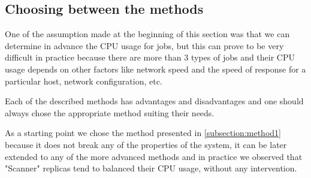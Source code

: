 \subsection{Choosing between the methods}
One of the assumption made at the beginning of this section was that we can determine in advance the CPU usage for jobs, but this can prove to be very difficult in practice because there are more than 3 types of jobs and their CPU usage depends on other factors like network speed and the speed of response for a particular host, network configuration, etc.

Each of the described methods has advantages and disadvantages and one should always chose the appropriate method suiting their needs.

As a starting point we chose the method presented in \ref{subsection:method1} because it does not break any of the properties of the system, it can be later extended to any of the more advanced methods and in practice we observed that "Scanner" replicas tend to balanced their CPU usage, without any intervention.
